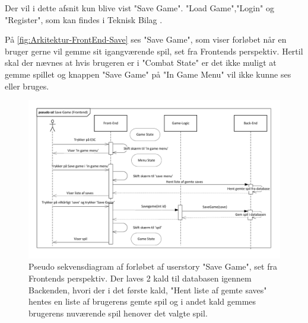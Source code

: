 Der vil i dette afsnit kun blive vist "Save Game". "Load Game","Login" og "Register", som kan findes i Teknisk Bilag \parencite[][Section 7.2.1]{TekniskBilag}.

\noindent På \autoref{fig:Arkitektur-FrontEnd-Save} ses "Save Game", som viser forløbet når en bruger gerne vil gemme sit igangværende spil, set fra Frontends perspektiv. 
Hertil skal der nævnes at hvis brugeren er i "Combat State" er det ikke muligt at gemme spillet og knappen "Save Game" på "In Game Menu" vil ikke kunne ses eller bruges.\\

\begin{figure}[H]
\centering
\includegraphics[width = \textwidth]{02-Body/Images/Front-End_-_Arkitektur-savegame.pdf}
\caption{Pseudo sekvensdiagram af forløbet af userstory "Save Game", set fra Frontends perspektiv. Der laves 2 kald til databasen igennem Backenden, hvori der i det første kald,  "Hent liste af gemte saves" hentes en liste af brugerens gemte spil og i andet kald gemmes brugerens nuværende spil henover det valgte spil.}
\label{fig:Arkitektur-FrontEnd-Save}
\end{figure}

\newpage
